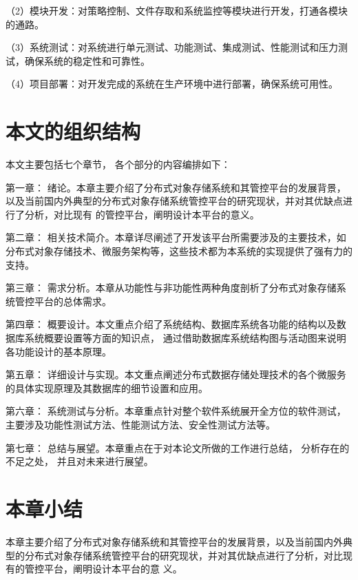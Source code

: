 （2）模块开发：对策略控制、文件存取和系统监控等模块进行开发，打通各模块的通路。

（3）系统测试：对系统进行单元测试、功能测试、集成测试、性能测试和压力测试，确保系统的稳定性和可靠性。

（4）项目部署：对开发完成的系统在生产环境中进行部署，确保系统可用性。

\section{本文的组织结构}

本文主要包括七个章节， 各个部分的内容编排如下： 

第一章： 绪论。本章主要介绍了分布式对象存储系统和其管控平台的发展背景，以及当前国内外典型的分布式对象存储系统管控平台的研究现状，并对其优缺点进行了分析，对比现有
的管控平台，阐明设计本平台的意义。

第二章： 相关技术简介。本章详尽阐述了开发该平台所需要涉及的主要技术，如分布式对象存储技术、微服务架构等，这些技术都为本系统的实现提供了强有力的支持。

第三章： 需求分析。本章从功能性与非功能性两种角度剖析了分布式对象存储系统管控平台的总体需求。

第四章： 概要设计。本文重点介绍了系统结构、数据库系统各功能的结构以及数据库系统概要设置等方面的知识点， 通过借助数据库系统结构图与活动图来说明各功能设计的基本原理。

第五章： 详细设计与实现。本文重点阐述分布式数据存储处理技术的各个微服务的具体实现原理及其数据库的细节设置和应用。

第六章： 系统测试与分析。本章重点针对整个软件系统展开全方位的软件测试， 主要涉及功能性测试方法、性能测试方法、安全性测试方法等。

第七章： 总结与展望。本章重点在于对本论文所做的工作进行总结， 分析存在的不足之处， 并且对未来进行展望。

\section{本章小结}

本章主要介绍了分布式对象存储系统和其管控平台的发展背景，以及当前国内外典型的分布式对象存储系统管控平台的研究现状，并对其优缺点进行了分析，对比现有的管控平台，阐明设计本平台的意
义。